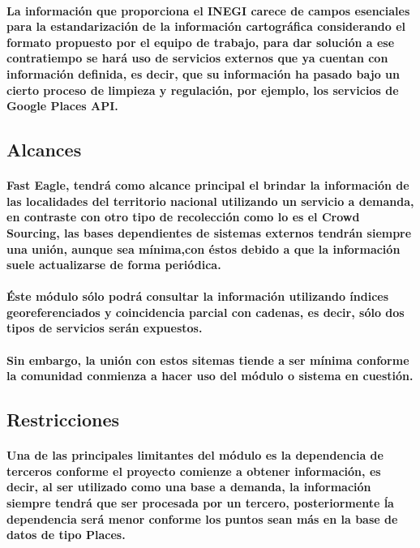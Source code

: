     \paragraph{La información que proporciona el INEGI carece de campos esenciales para la estandarización de la información cartográfica considerando el formato propuesto por el equipo de trabajo, para dar solución a ese contratiempo se hará uso de servicios externos que ya cuentan con información definida, es decir, que su información ha pasado bajo un cierto proceso de limpieza y regulación, por ejemplo, los servicios de Google Places API.}
  \subsection{Alcances}
    \paragraph{Fast Eagle, tendrá como alcance principal el brindar la información de las localidades del territorio nacional utilizando un servicio a demanda, en contraste con otro tipo de recolección como lo es el Crowd Sourcing\cite{37}, las bases dependientes de sistemas externos tendrán siempre una unión, aunque sea mínima,con éstos debido a que la información suele actualizarse de forma periódica.}
    \paragraph{Éste módulo sólo podrá consultar la información utilizando índices georeferenciados y coincidencia parcial con cadenas, es decir, sólo dos tipos de servicios serán expuestos.} 
    \paragraph{Sin embargo, la unión con estos sitemas tiende a ser mínima conforme la comunidad conmienza a hacer uso del módulo o sistema en cuestión.}
  \subsection{Restricciones}
    \paragraph{Una de las principales limitantes del módulo es la dependencia de terceros conforme el proyecto comienze a obtener información, es decir, al ser utilizado como una base a demanda, la información siempre tendrá que ser procesada por un tercero, posteriormente ĺa dependencia será menor conforme los puntos sean más en la base de datos de tipo Places.}
